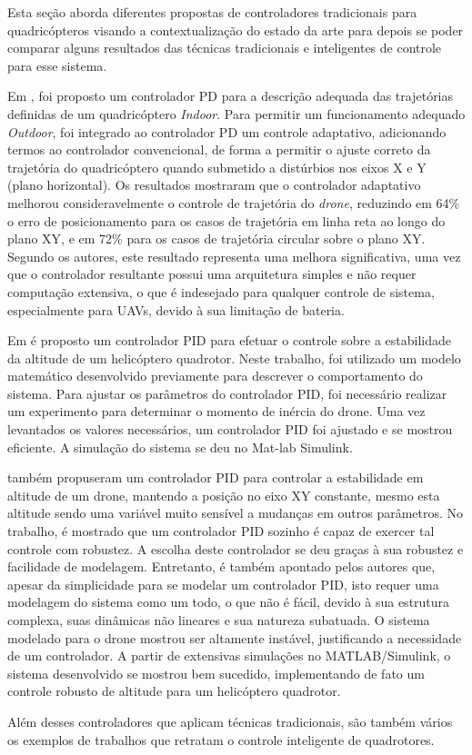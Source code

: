 Esta seção aborda diferentes propostas de controladores tradicionais para quadricópteros visando a contextualização do estado da arte para depois se poder comparar alguns resultados das técnicas tradicionais e inteligentes de controle para esse sistema.

Em \cite{Razinkova2014}, foi proposto um controlador PD para a descrição adequada das trajetórias definidas de um quadricóptero \textit{Indoor}. Para permitir um funcionamento adequado \textit{Outdoor}, foi integrado ao controlador PD um controle adaptativo, adicionando termos ao controlador convencional, de forma a permitir o ajuste correto da trajetória do quadricóptero quando submetido a distúrbios nos eixos X e Y (plano horizontal). Os resultados mostraram que o controlador adaptativo melhorou consideravelmente o controle de trajetória do \textit{drone}, reduzindo em 64\% o erro de posicionamento para os casos de trajetória em linha reta ao longo do plano XY, e em 72\% para os casos de trajetória circular sobre o plano XY. Segundo os autores, este resultado representa uma melhora significativa, uma vez que o controlador resultante possui uma arquitetura simples e não requer computação extensiva, o que é indesejado para qualquer controle de sistema, especialmente para UAVs, devido à sua limitação de bateria.

Em \cite{Mustapa2014} é proposto um controlador PID para efetuar o controle sobre a estabilidade da altitude de um helicóptero quadrotor. Neste trabalho, foi utilizado um modelo matemático desenvolvido previamente para descrever o comportamento do sistema. Para ajustar os parâmetros do controlador PID, foi necessário realizar um experimento para determinar o momento de inércia do drone. Uma vez levantados os valores necessários, um controlador PID foi ajustado e se mostrou eficiente. A simulação do sistema se deu no Mat-lab Simulink.

 também propuseram um controlador PID para controlar a estabilidade em altitude de um drone, mantendo a posição no eixo XY constante, mesmo esta altitude sendo uma variável muito sensível a mudanças em outros parâmetros. No trabalho, é mostrado que um controlador PID sozinho é capaz de exercer tal controle com robustez. A escolha deste controlador se deu graças à sua robustez e facilidade de modelagem. Entretanto, é também apontado pelos autores que, apesar da simplicidade para se modelar um controlador PID, isto requer uma modelagem do sistema como um todo, o que não é fácil, devido à sua estrutura complexa, suas dinâmicas não lineares e sua natureza subatuada. O sistema modelado para o drone mostrou ser altamente instável, justificando a necessidade de um controlador. A partir de extensivas simulações no MATLAB/Simulink, o sistema desenvolvido se mostrou bem sucedido, implementando de fato um controle robusto de altitude para um helicóptero quadrotor.

Além desses controladores que aplicam técnicas tradicionais, são também vários os exemplos de trabalhos que retratam o controle inteligente de quadrotores.